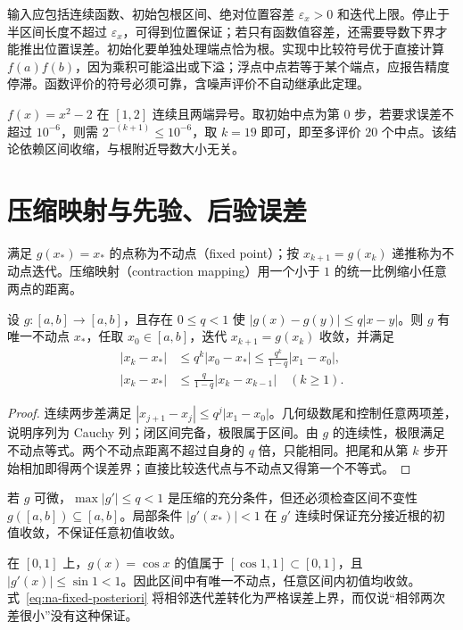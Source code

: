 \documentclass[UTF8,12pt,a4paper,fontset=fandol]{ctexbook}
\begin{document}
输入应包括连续函数、初始包根区间、绝对位置容差 $\varepsilon_x>0$ 和迭代上限。停止于半区间长度不超过 $\varepsilon_x$，可得到位置保证；若只有函数值容差，还需要导数下界才能推出位置误差。初始化要单独处理端点恰为根。实现中比较符号优于直接计算 $f(a)f(b)$，因为乘积可能溢出或下溢；浮点中点若等于某个端点，应报告精度停滞。函数评价的符号必须可靠，含噪声评价不自动继承此定理。

\begin{example}[计算平方根的包根方法]
$f(x)=x^2-2$ 在 $[1,2]$ 连续且两端异号。取初始中点为第 $0$ 步，若要求误差不超过 $10^{-6}$，则需 $2^{-(k+1)}\le10^{-6}$，取 $k=19$ 即可，即至多评价 $20$ 个中点。该结论依赖区间收缩，与根附近导数大小无关。
\end{example}

\section{压缩映射与先验、后验误差}
满足 $g(x_*)=x_*$ 的点称为不动点（fixed point）；按 $x_{k+1}=g(x_k)$ 递推称为不动点迭代。压缩映射（contraction mapping）用一个小于 $1$ 的统一比例缩小任意两点的距离。

\begin{theorem}[区间上的压缩映射]
\label{thm:na-contraction}
设 $g:[a,b]\to[a,b]$，且存在 $0\le q<1$ 使 $|g(x)-g(y)|\le q|x-y|$。则 $g$ 有唯一不动点 $x_*$，任取 $x_0\in[a,b]$，迭代 $x_{k+1}=g(x_k)$ 收敛，并满足
\begin{align}
 |x_k-x_*|&\le q^k|x_0-x_*|\le\frac{q^k}{1-q}|x_1-x_0|,\label{eq:na-fixed-priori}\\
 |x_k-x_*|&\le\frac{q}{1-q}|x_k-x_{k-1}|\quad(k\ge1).\label{eq:na-fixed-posteriori}
\end{align}
\end{theorem}
\begin{proof}
连续两步差满足 $|x_{j+1}-x_j|\le q^j|x_1-x_0|$。几何级数尾和控制任意两项差，说明序列为 Cauchy 列；闭区间完备，极限属于区间。由 $g$ 的连续性，极限满足不动点等式。两个不动点距离不超过自身的 $q$ 倍，只能相同。把尾和从第 $k$ 步开始相加即得两个误差界；直接比较迭代点与不动点又得第一个不等式。
\end{proof}

若 $g$ 可微，$\max|g'|\le q<1$ 是压缩的充分条件，但还必须检查区间不变性 $g([a,b])\subseteq[a,b]$。局部条件 $|g'(x_*)|<1$ 在 $g'$ 连续时保证充分接近根的初值收敛，不保证任意初值收敛。

\begin{example}[求解 $x=\cos x$]
在 $[0,1]$ 上，$g(x)=\cos x$ 的值属于 $[\cos1,1]\subset[0,1]$，且 $|g'(x)|\le\sin1<1$。因此区间中有唯一不动点，任意区间内初值均收敛。式~\eqref{eq:na-fixed-posteriori} 将相邻迭代差转化为严格误差上界，而仅说“相邻两次差很小”没有这种保证。
\end{example}
\end{document}
